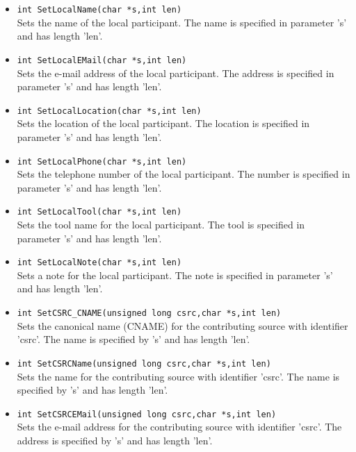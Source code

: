 \begin{itemize}
\item {\tt int SetLocalName(char *s,int len)}\\
	Sets the name of the local participant. The name is specified in
	parameter 's' and has length 'len'.
	
\item {\tt int SetLocalEMail(char *s,int len)}\\
	Sets the e-mail address of the local participant. The address is
	specified in parameter 's' and has length 'len'.

\item {\tt int SetLocalLocation(char *s,int len)}\\
	Sets the location of the local participant. The location is specified
	in parameter 's' and has length 'len'.

\item {\tt int SetLocalPhone(char *s,int len)}\\
	Sets the telephone number of the local participant. The number is
	specified in parameter 's' and has length 'len'.

\item {\tt int SetLocalTool(char *s,int len)}\\
	Sets the tool name for the local participant. The tool is specified
	in parameter 's' and has length 'len'.

\item {\tt int SetLocalNote(char *s,int len)}\\
	Sets a note for the local participant. The note is specified in
	parameter 's' and has length 'len'.

\item {\tt int SetCSRC\_CNAME(unsigned long csrc,char *s,int len)}\\
	Sets the canonical name (CNAME) for the contributing source with
	identifier 'csrc'. The name is specified by 's' and has length 'len'.

\item {\tt int SetCSRCName(unsigned long csrc,char *s,int len)}\\
	Sets the name for the contributing source with identifier 'csrc'.
	The name is specified by 's' and has length 'len'.

\item {\tt int SetCSRCEMail(unsigned long csrc,char *s,int len)}\\
	Sets the e-mail address for the contributing source with identifier
	'csrc'.	The address is specified by 's' and has length 'len'.


\end{itemize}
